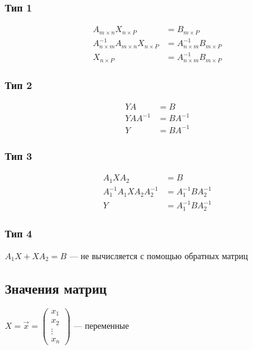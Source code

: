 \documentclass{article}
\begin{document}
\subsubsection*{Тип 1}

\begin{align*}
A_{m \times n} X_{n \times P} &= B_{m \times P}\\
A_{n \times m}^{-1} A_{m \times n} X_{n \times P} &= A_{n \times m}^{-1} B_{m \times P}\\
X_{n \times P} &= A_{n \times m}^{-1} B_{m \times P}
\end{align*}

\subsubsection*{Тип 2}

\begin{align*}
Y A &= B \\
Y A A^{-1} &= B A^{-1} \\
Y &= B A^{-1}
\end{align*}

\subsubsection*{Тип 3}

\begin{align*}
	A_1 X A_2 &= B \\
	A_1^{-1} A_1 X A_2 A_2^{-1} &= A_1^{-1} B A_2^{-1} \\
	Y &= A_1^{-1} B A_2^{-1}
\end{align*}	

\subsubsection*{Тип 4}

$A_1 X + X A_2 = B$ --- не вычисляется с помощью обратных матриц

\subsection{Значения матриц}

$
X = \vec{x} = \begin{pmatrix}
	x_1 \\
	x_2 \\
	\vdots \\
	x_n
\end{pmatrix}
$ --- переменные
\end{document}
